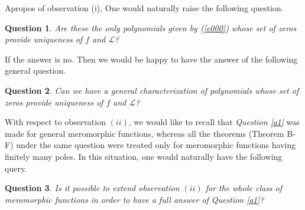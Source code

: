 \documentclass[a4paper,draft]{amsproc}
\theoremstyle{plain}
\newtheorem{ques}{Question}[section]
\theoremstyle{definition}
\theoremstyle{remark}
\newcommand{\be}{\begin{equation}}
\newcommand{\ee}{\end{equation}}
\numberwithin{equation}{section}
\begin{document}
\vspace{0.1in}\par  %
Apropos of observation (i), One would naturally raise the following question.
\begin{ques}
Are these the only polynomials  given by (\ref{e000}) whose set of zeros provide uniqueness of $f$ and $\mathcal{L}$?%
\end{ques} 
If the answer is no. Then we would be happy to have the answer of the following general question.
\begin{ques}
Can we have a general characterization of polynomials  whose set of zeros provide uniqueness of $f$ and $\mathcal{L}$?
\end{ques}  
With respect to observation $(ii)$, we would like to recall that {\em Question \ref{q1}} was made for general meromorphic functions, whereas all the theorems (Theorem B-F) under the same question were treated only for meromorphic functions having finitely many poles. In this situation,  one would naturally have the following query.
\begin{ques}\label{q12}
Is it possible to extend observation $(ii)$ for the whole class of meromorphic functions in order to have a full answer of {\em Question \ref{q1}}?
\end{ques}
\end{document}
